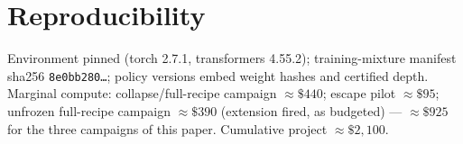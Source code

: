 \documentclass[11pt]{article}
\begin{document}
\section{Reproducibility}
Environment pinned (torch 2.7.1, transformers 4.55.2); training-mixture
manifest sha256 \texttt{8e0bb280\ldots}; policy versions embed weight
hashes and certified depth. Marginal compute: collapse/full-recipe
campaign ${\approx}\$440$; escape pilot ${\approx}\$95$; unfrozen
full-recipe campaign ${\approx}\$390$ (extension fired, as budgeted)
--- ${\approx}\$925$ for the three campaigns of this paper. Cumulative
project ${\approx}\$2{,}100$.
\end{document}
